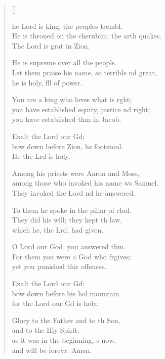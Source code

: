 \settowidth{\versewidth}{He is throned on the cherubim; the earth quakes. *}
\begin{verse}[\versewidth]
  \begin{patverse}
he Lord is king; the peoples trembl.\Flex\\
He is throned on the cherubim; the arth quakes.\Med\\
The Lord is grat in Zion.

He is supreme over all the peopls.\Flex\\
Let them praise his name, so terrible nd great,\Med\\
he is holy, fll of power.

You are a king who loves what is r\pointup{\i}ght;\Flex\\
you have established equity, justice nd right;\Med\\
you have established thm in Jacob.

Exalt the Lord our Gd;\Flex\\
bow down before Zion, h\pointup{\i}s footstool.\Med\\
He the Lrd is holy.

Among his priests were Aaron and Moss,\Flex\\
among those who invoked his name ws Samuel.\Med\\
They invoked the Lord nd he answered.

To them he spoke in the pillar of clud.\Flex\\
They did his will; they kept th law,\Med\\
which he, the Lrd, had given.

O Lord our God, you answered thm.\Flex\\
For them you were a God who frgives;\Med\\
yet you punished thir offenses.

Exalt the Lord our Gd;\Flex\\
bow down before his hol mountain\Med\\
for the Lord our Gd is holy.

Glory to the Father and to th Son,\Med\\
and to the Hly Spirit:\\
as it was in the beginning, \pointup{\i}s now,\Med\\
and will be forevr. Amen.
  \end{patverse}
\end{verse}
